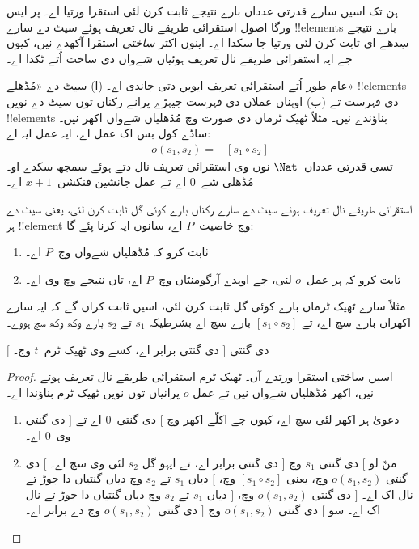 \documentclass[../../../include/open-logic-section]{subfiles}
\begin{document}


ہن تک اسیں سارے قدرتی عدداں بارے نتیجے ثابت کرن لئی استقرا ورتیا اے۔ پر ایس ورگا اصول استقرائی طریقے نال تعریف ہوئے سیٹ دے سارے !!{element}s بارے نتیجے سِدھے ای ثابت کرن لئی ورتیا جا سکدا اے۔ اینوں اکثر \emph{ساختی} استقرا آکھدے نیں، کیوں جے ایہ استقرائی طریقے نال تعریف ہوئیاں شےواں دی ساخت اُتے ٹکدا اے۔

عام طور اُتے استقرائی تعریف ایویں دتی جاندی اے۔ (ا) سیٹ دے «مُڈھلے» !!{element}s دی فہرست تے (ب) اوہناں عملاں دی فہرست جیہڑے پرانے رکناں توں سیٹ دے نویں !!{element}s بناؤندے نیں۔ مثلاً ٹھیک ٹرماں دی صورت وچ مُڈھلیاں شےواں اکھر نیں۔ ساڈے کول بس اک عمل اے، ایہ عمل ایہ اے:
\begin{align*}
  o(s_1, s_2) = & [s_1 \circ s_2]
\end{align*}
تسی قدرتی عدداں~$\Nat$ نوں وی استقرائی تعریف نال دتے ہوئے سمجھ سکدے او۔ مُڈھلی شے~$0$ اے تے عمل جانشین فنکشن~$x + 1$ اے۔

استقرائی طریقے نال تعریف ہوئے سیٹ دے سارے رکناں بارے کوئی گل ثابت کرن لئی، یعنی سیٹ دے ہر !!{element} وچ خاصیت~$P$ اے، سانوں ایہ کرنا پئے گا:
\begin{enumerate}
\item ثابت کرو کہ مُڈھلیاں شےواں وچ~$P$ اے۔
\item ثابت کرو کہ ہر عمل~$o$ لئی، جے اوہدے آرگومنٹاں وچ~$P$ اے، تاں نتیجے وچ وی اے۔
\end{enumerate}
مثلاً سارے ٹھیک ٹرماں بارے کوئی گل ثابت کرن لئی، اسیں ثابت کراں گے کہ ایہ سارے اکھراں بارے سچ اے، تے $[s_1 \circ s_2]$ بارے سچ اے بشرطیکہ $s_1$ تے $s_2$ بارے وکھ وکھ سچ ہووے۔

\begin{prop}
  $[$ دی گنتی $]$ دی گنتی برابر اے، کسے وی ٹھیک ٹرم~$t$ وچ۔
\end{prop}

\begin{proof}
اسیں ساختی استقرا ورتدے آں۔ ٹھیک ٹرم استقرائی طریقے نال تعریف ہوئے نیں، اکھر مُڈھلیاں شےواں نیں تے عمل $o$ پرانیاں توں نویں ٹھیک ٹرم بناؤندا اے۔
\begin{enumerate}
\item دعویٰ ہر اکھر لئی سچ اے، کیوں جے اکلّے اکھر وچ $[$ دی گنتی~$0$ اے تے $]$ دی گنتی وی~$0$ اے۔
\item منّ لو $[$ دی گنتی $s_1$ وچ $]$ دی گنتی برابر اے، تے ایہو گل $s_2$ لئی وی سچ اے۔ $[$ دی گنتی $o(s_1, s_2)$ وچ، یعنی $[s_1 \circ s_2]$ وچ، $[$ دیاں $s_1$ تے $s_2$ وچ دیاں گنتیاں دا جوڑ تے نال اک اے۔ $]$ دی گنتی $o(s_1, s_2)$ وچ، $]$ دیاں $s_1$ تے $s_2$ وچ دیاں گنتیاں دا جوڑ تے نال اک اے۔ سو $[$ دی گنتی $o(s_1, s_2)$ وچ $]$ دی گنتی $o(s_1,s_2)$ وچ دے برابر اے۔
\end{enumerate}
\end{proof}
\end{document}
